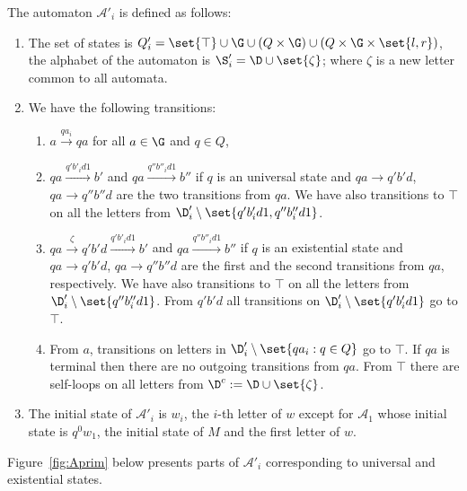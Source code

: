 \documentclass{LMCS}
\theoremstyle{plain}\newtheorem{remark}{Remark}
\theoremstyle{plain}\newtheorem{lemma}[thm]{Lemma}
\renewcommand{\Aa}{\mathcal{A}}
\newcommand{\trans}[1]{\stackrel{#1}{\longrightarrow}}
\newcommand{\choice}{\zeta}
\begin{document}
The automaton $\Aa'_i$ is defined as follows:
\begin{enumerate}[$\bullet$]
\item The set of states is $Q'_i=\set{\top}\cup\G\cup (Q\times\G)\cup
  (Q\times\G\times\set{l,r})$, the alphabet of the automaton is
  $\S'_i=\D\cup\set{\choice}$; where $\choice$ is a new letter common
  to all  automata.

\item We have the following transitions: 
  \begin{enumerate}[$-$]
  \item $a\trans{qa_i} qa$ for all $a\in \G$ and $q\in Q$,

  \item $qa\trans{q'b'_id1} b'$ and $qa\trans{q''b''_id1} b''$ if $q$ is
    an universal state and $qa\to q'b'd$, $qa\to q''b''d$ are the two
    transitions from $qa$. We have also transitions to $\top$ on all
    the letters from $\D'_i\setminus \set{q'b'_id1,q''b''_id1}$.

  \item $qa\trans{\choice} q'b'd\trans{q'b'_id1}b'$ and
    $qa\trans{q''b''_id1} b''$ if $q$ is an existential state and
    $qa\to q'b'd$, $qa\to q''b''d$ are the first and the second
    transitions from $qa$, respectively. We have also transitions to
    $\top$ on all the letters from $\D'_i\setminus \set{q''b''_id1}$. 
     From $q'b'd$ all transitions
    on $\D'_i \setminus \set{q'b'_id1}$ go to $\top$.


  \item From $a$, transitions on letters in $\D'_i \setminus \set{qa_i
      : q\in Q}$ go to $\top$.  If $qa$ is terminal then there are no
    outgoing transitions from $qa$.  From $\top$ there are self-loops
    on all letters from $\D^c := \D\cup\set{\choice}$.
  \end{enumerate}

\item The initial state of $\Aa'_i$ is $w_i$, the $i$-th letter
  of $w$ except for $\Aa_1$ whose initial state is $q^0w_1$, the
  initial state of $M$ and the first letter of $w$.
\end{enumerate}
Figure~\ref{fig:Aprim} below presents parts of $\Aa'_i$ corresponding to
universal and existential states.
\vspace{2ex}
\end{document}

